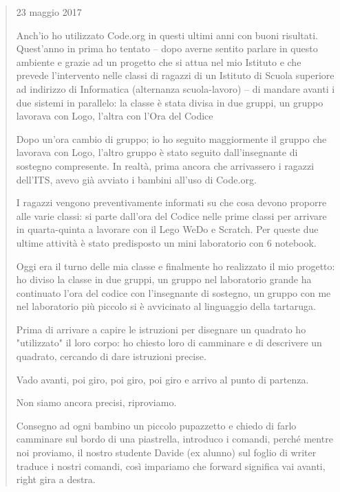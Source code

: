 \begin{quote}
23 maggio 2017

Anch'io ho utilizzato Code.org in questi ultimi anni con buoni risultati. Quest'anno in prima ho tentato – dopo averne sentito parlare in questo ambiente e grazie ad un progetto che si attua nel mio Istituto e che prevede l'intervento nelle classi di ragazzi di un Istituto di Scuola superiore ad indirizzo di Informatica (alternanza scuola-lavoro) – di mandare avanti i due sistemi in parallelo: la classe è stata divisa in due gruppi, un gruppo lavorava con Logo, l'altra con l'Ora del Codice

Dopo un'ora cambio di gruppo; io ho seguito maggiormente il gruppo che lavorava con Logo, l'altro gruppo è stato seguito dall'insegnante di sostegno compresente. In realtà, prima ancora che arrivassero i ragazzi dell'ITS, avevo già avviato i bambini all'uso di Code.org.

I ragazzi vengono preventivamente informati su che cosa devono proporre alle varie classi: si parte dall'ora del Codice nelle prime classi per arrivare in quarta-quinta a lavorare con il Lego WeDo e Scratch. Per queste due ultime attività è stato predisposto un mini laboratorio con 6 notebook. 

Oggi era il turno delle mia classe e finalmente ho realizzato il mio progetto: ho diviso la classe in due gruppi, un gruppo nel laboratorio grande ha continuato l'ora del codice con l'insegnante di sostegno, un gruppo con me nel laboratorio più piccolo si è avvicinato al linguaggio della tartaruga. 

Prima di arrivare a capire le istruzioni per disegnare un quadrato ho "utilizzato" il loro corpo: ho chiesto loro di camminare e di descrivere un quadrato, cercando di dare istruzioni precise. 

Vado avanti, poi giro, poi giro, poi giro e arrivo al punto di partenza.

Non siamo ancora precisi, riproviamo.

Consegno ad ogni bambino un piccolo pupazzetto e chiedo di farlo camminare sul bordo di una piastrella, introduco i comandi, perché mentre noi proviamo, il nostro studente Davide (ex alunno) sul foglio di writer traduce i nostri comandi, così impariamo che forward significa vai avanti, right gira a destra.


\end{quote}
